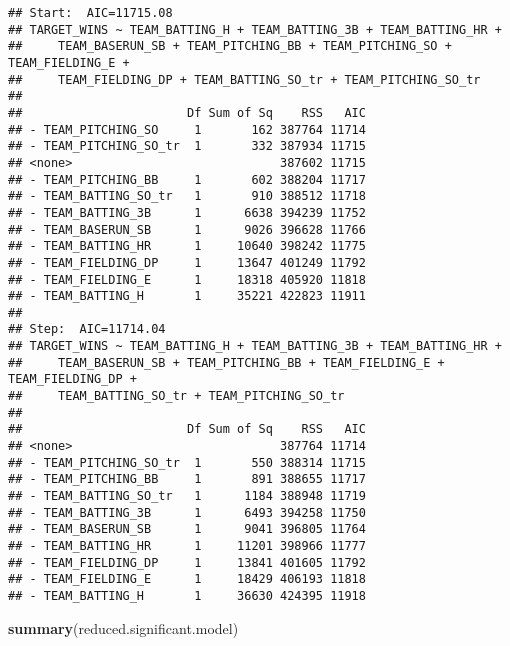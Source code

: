 \documentclass[]{article}
\newenvironment{Shaded}{\begin{snugshade}}{\end{snugshade}}
\newcommand{\KeywordTok}[1]{\textcolor[rgb]{0.13,0.29,0.53}{\textbf{#1}}}
\newcommand{\NormalTok}[1]{#1}
\begin{document}
\begin{verbatim}
## Start:  AIC=11715.08
## TARGET_WINS ~ TEAM_BATTING_H + TEAM_BATTING_3B + TEAM_BATTING_HR + 
##     TEAM_BASERUN_SB + TEAM_PITCHING_BB + TEAM_PITCHING_SO + TEAM_FIELDING_E + 
##     TEAM_FIELDING_DP + TEAM_BATTING_SO_tr + TEAM_PITCHING_SO_tr
## 
##                       Df Sum of Sq    RSS   AIC
## - TEAM_PITCHING_SO     1       162 387764 11714
## - TEAM_PITCHING_SO_tr  1       332 387934 11715
## <none>                             387602 11715
## - TEAM_PITCHING_BB     1       602 388204 11717
## - TEAM_BATTING_SO_tr   1       910 388512 11718
## - TEAM_BATTING_3B      1      6638 394239 11752
## - TEAM_BASERUN_SB      1      9026 396628 11766
## - TEAM_BATTING_HR      1     10640 398242 11775
## - TEAM_FIELDING_DP     1     13647 401249 11792
## - TEAM_FIELDING_E      1     18318 405920 11818
## - TEAM_BATTING_H       1     35221 422823 11911
## 
## Step:  AIC=11714.04
## TARGET_WINS ~ TEAM_BATTING_H + TEAM_BATTING_3B + TEAM_BATTING_HR + 
##     TEAM_BASERUN_SB + TEAM_PITCHING_BB + TEAM_FIELDING_E + TEAM_FIELDING_DP + 
##     TEAM_BATTING_SO_tr + TEAM_PITCHING_SO_tr
## 
##                       Df Sum of Sq    RSS   AIC
## <none>                             387764 11714
## - TEAM_PITCHING_SO_tr  1       550 388314 11715
## - TEAM_PITCHING_BB     1       891 388655 11717
## - TEAM_BATTING_SO_tr   1      1184 388948 11719
## - TEAM_BATTING_3B      1      6493 394258 11750
## - TEAM_BASERUN_SB      1      9041 396805 11764
## - TEAM_BATTING_HR      1     11201 398966 11777
## - TEAM_FIELDING_DP     1     13841 401605 11792
## - TEAM_FIELDING_E      1     18429 406193 11818
## - TEAM_BATTING_H       1     36630 424395 11918
\end{verbatim}

\begin{Shaded}
\begin{Highlighting}[]
\KeywordTok{summary}\NormalTok{(reduced.significant.model)}
\end{Highlighting}
\end{Shaded}
\end{document}
